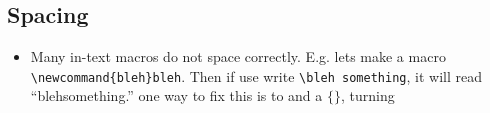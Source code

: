 \subsection{Spacing}
\begin{itemize}
    \item Many in-text macros do not space correctly. E.g. lets make a macro \texttt{\textbackslash newcommand\{bleh\}{bleh}}. Then if use write \texttt{\textbackslash bleh something}, it will read ``blehsomething.'' one way to fix this is to and a $\{\}$, turning %
\end{itemize}